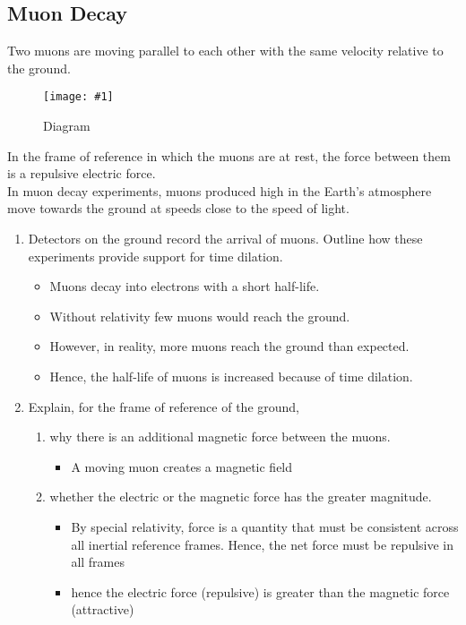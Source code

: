 \documentclass[a4paper,12pt]{article}
\newcommand{\lb}{\\[8pt]}
\newcommand{\img}[4]{\begin{center}
  \begin{figure}[H]
    \centering
    \texttt{[image: \#1]}
    \caption{#3}
    \label{fig:#4}
  \end{figure}
\end{center}}
\begin{document}
\pagebreak

\subsection{Muon Decay}

Two muons are moving parallel to each other with the same velocity relative to the ground.
\img{ex/4.png}{0.55}{Diagram}{muon}

In the frame of reference in which the muons are at rest, the force between them is a repulsive electric force.\lb
In muon decay experiments, muons produced high in the Earth's atmosphere move towards the ground at speeds close to the speed of light.

\begin{enumerate}[label=(\alph*)]
  \item Detectors on the ground record the arrival of muons. Outline how these experiments provide support for time dilation.
        \begin{itemize}
          \item Muons decay into electrons with a short half-life.
          \item Without relativity few muons would reach the ground.
          \item However, in reality, more muons reach the ground than expected.
          \item Hence, the half-life of muons is increased because of time dilation.
        \end{itemize}
  \item Explain, for the frame of reference of the ground,
        \begin{enumerate}[label=(\roman*)]
          \item why there is an additional magnetic force between the muons.\begin{itemize}
                  \item A moving muon creates a magnetic field
                \end{itemize}
          \item whether the electric or the magnetic force has the greater magnitude.
                \begin{itemize}
                  \item By special relativity, force is a quantity that must be consistent across all inertial reference frames. Hence, the net force must be repulsive in all frames
                  \item hence the electric force (repulsive) is greater than the magnetic force (attractive)
                \end{itemize}
        \end{enumerate}
\end{enumerate}
\end{document}
